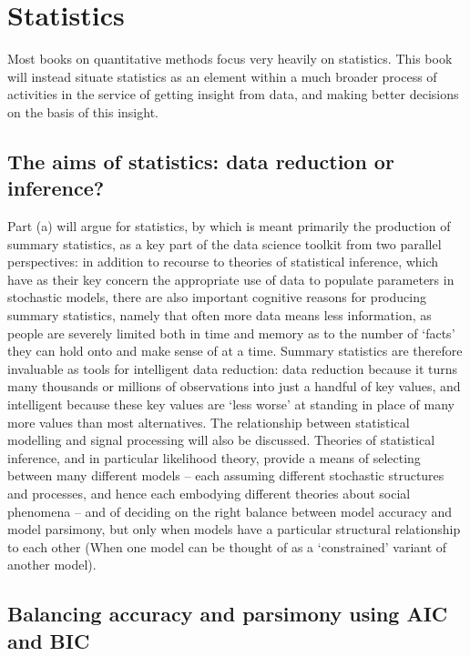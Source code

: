 \documentclass[]{book}
\theoremstyle{definition}
\theoremstyle{definition}
\theoremstyle{definition}
\theoremstyle{remark}
\begin{document}
\chapter{Statistics}\label{stats}

Most books on quantitative methods focus very heavily on statistics.
This book will instead situate statistics as an element within a much
broader process of activities in the service of getting insight from
data, and making better decisions on the basis of this insight.

\section{The aims of statistics: data reduction or
inference?}\label{the-aims-of-statistics-data-reduction-or-inference}

Part (a) will argue for statistics, by which is meant primarily the
production of summary statistics, as a key part of the data science
toolkit from two parallel perspectives: in addition to recourse to
theories of statistical inference, which have as their key concern the
appropriate use of data to populate parameters in stochastic models,
there are also important cognitive reasons for producing summary
statistics, namely that often more data means less information, as
people are severely limited both in time and memory as to the number of
`facts' they can hold onto and make sense of at a time. Summary
statistics are therefore invaluable as tools for intelligent data
reduction: data reduction because it turns many thousands or millions of
observations into just a handful of key values, and intelligent because
these key values are `less worse' at standing in place of many more
values than most alternatives. The relationship between statistical
modelling and signal processing will also be discussed. Theories of
statistical inference, and in particular likelihood theory, provide a
means of selecting between many different models -- each assuming
different stochastic structures and processes, and hence each embodying
different theories about social phenomena -- and of deciding on the
right balance between model accuracy and model parsimony, but only when
models have a particular structural relationship to each other (When one
model can be thought of as a `constrained' variant of another model).

\section{Balancing accuracy and parsimony using AIC and
BIC}\label{balancing-accuracy-and-parsimony-using-aic-and-bic}
\end{document}
